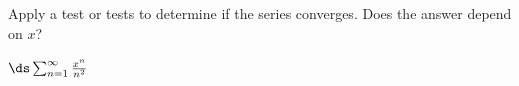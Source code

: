 Apply a test or tests to determine if the series converges.  Does the answer depend on $x$?

\medskip \qquad $\ds \sum_{n=1}^\infty \frac{x^n}{n^2}$
